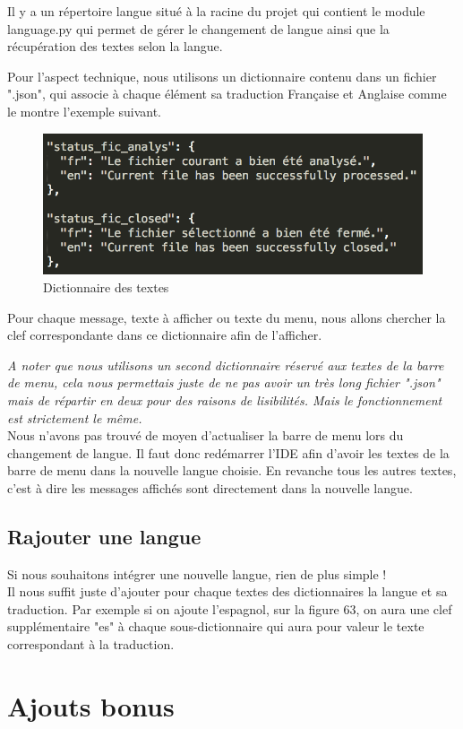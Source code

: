 \documentclass[a4paper,12pt]{article}
\begin{document}
	Il y a un répertoire langue situé à la racine du projet qui contient le module language.py qui permet de gérer le changement de langue ainsi que la récupération des textes selon la langue.
	
	Pour l'aspect technique, nous utilisons un dictionnaire contenu dans un fichier ".json", qui associe à chaque élément sa traduction Française et Anglaise comme le montre l'exemple suivant.
	
	\begin{figure}[h!]
			\begin{center}
					\includegraphics[scale=1]{images/langue_json}
					\caption{Dictionnaire des textes}
			\end{center}
	\end{figure}
	
	Pour chaque message, texte à afficher ou texte du menu, nous allons chercher la clef correspondante dans ce dictionnaire afin de l'afficher. 
	
	\textit{A noter que nous utilisons un second dictionnaire réservé aux textes de la barre de menu, cela nous permettais juste de ne pas avoir un très long fichier ".json" mais de répartir en deux pour des raisons de lisibilités. Mais le fonctionnement est strictement le même.}\\
	
	Nous n'avons pas trouvé de moyen d'actualiser la barre de menu lors du changement de langue. Il faut donc redémarrer l'IDE afin d'avoir les textes de la barre de menu dans la nouvelle langue choisie. En revanche tous les autres textes, c'est à dire les messages affichés sont directement dans la nouvelle langue.
	
\subsection{Rajouter une langue}

	Si nous souhaitons intégrer une nouvelle langue, rien de plus simple !\\
	
	Il nous suffit juste d'ajouter pour chaque textes des dictionnaires la langue et sa traduction. Par exemple si on ajoute l'espagnol, sur la figure 63, on aura une clef supplémentaire "es" à chaque sous-dictionnaire qui aura pour valeur le texte correspondant à la traduction.

\section{Ajouts bonus}

	
\end{document}
